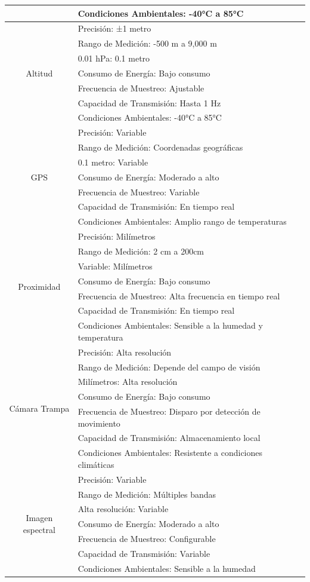 \begin{longtable}[c]{|c|l|}
 & Condiciones Ambientales: -40°C   a 85°C \\ \hline
\multirow{7}{*}{Altitud} & Precisión: ±1 metro \\
 & Rango de Medición: -500 m a   9,000 m \\
 & 0.01 hPa: 0.1 metro \\
 & Consumo de Energía: Bajo   consumo \\
 & Frecuencia de Muestreo:   Ajustable \\
 & Capacidad de Transmisión:   Hasta 1 Hz \\
 & Condiciones Ambientales: -40°C   a 85°C \\ \hline
\multirow{7}{*}{GPS} & Precisión: Variable \\
 & Rango de Medición: Coordenadas   geográficas \\
 & 0.1 metro: Variable \\
 & Consumo de Energía: Moderado a   alto \\
 & Frecuencia de Muestreo:   Variable \\
 & Capacidad de Transmisión: En   tiempo real \\
 & Condiciones Ambientales:   Amplio rango de temperaturas \\ \hline
\multirow{7}{*}{Proximidad} & Precisión: Milímetros \\
 & Rango de Medición: 2 cm a   200cm \\
 & Variable: Milímetros \\
 & Consumo de Energía: Bajo   consumo \\
 & Frecuencia de Muestreo: Alta   frecuencia en tiempo real \\
 & Capacidad de Transmisión: En   tiempo real \\
 & Condiciones Ambientales:   Sensible a la humedad y temperatura \\ \hline
\multirow{7}{*}{Cámara Trampa} & Precisión: Alta resolución \\
 & Rango de Medición: Depende del   campo de visión \\
 & Milímetros: Alta resolución \\
 & Consumo de Energía: Bajo   consumo \\
 & Frecuencia de Muestreo:   Disparo por detección de movimiento \\
 & Capacidad de Transmisión:   Almacenamiento local \\
 & Condiciones Ambientales:   Resistente a condiciones climáticas \\ \hline
\multirow{7}{*}{Imagen espectral} & Precisión: Variable \\
 & Rango de Medición: Múltiples   bandas \\
 & Alta resolución: Variable \\
 & Consumo de Energía: Moderado a   alto \\
 & Frecuencia de Muestreo:   Configurable \\
 & Capacidad de Transmisión:   Variable \\
 & Condiciones Ambientales:   Sensible a la humedad \\ \hline
\end{longtable}



